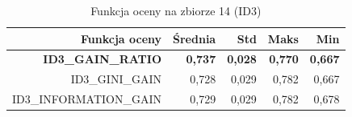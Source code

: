 \begin{table}[htbp]
\centering
\small
\setlength{\tabcolsep}{6pt}
\renewcommand{\arraystretch}{1.2}
\caption{Funkcja oceny na zbiorze 14 (ID3)}
\label{tab:ID3_eval_function_14}
\begin{tabular}{r|r|r|r|r}
\toprule
Funkcja oceny & Średnia & Std & Maks & Min \\
\hline
\textbf{ID3\_GAIN\_RATIO} & \textbf{0,737} & \textbf{0,028} & \textbf{0,770} & \textbf{0,667} \\
ID3\_GINI\_GAIN & 0,728 & 0,029 & 0,782 & 0,667 \\
ID3\_INFORMATION\_GAIN & 0,729 & 0,029 & 0,782 & 0,678 \\
\bottomrule
\end{tabular}
\end{table}